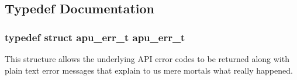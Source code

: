 \subsection{Typedef Documentation}
\subsubsection[{\texorpdfstring{apu\+\_\+err\+\_\+t}{apu_err_t}}]{\setlength{\rightskip}{0pt plus 5cm}typedef struct {\bf apu\+\_\+err\+\_\+t}  {\bf apu\+\_\+err\+\_\+t}}\hypertarget{group__apu__errno_ga5871eecd18a15baa660bb5769e32b097}{}\label{group__apu__errno_ga5871eecd18a15baa660bb5769e32b097}
This structure allows the underlying A\+PI error codes to be returned along with plain text error messages that explain to us mere mortals what really happened. 